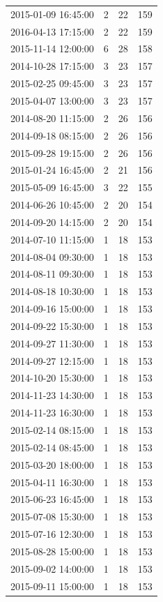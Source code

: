 \begin{tabular}{lrrr}
2015-01-09 16:45:00 & 2 & 22 & 159 \\
2016-04-13 17:15:00 & 2 & 22 & 159 \\
2015-11-14 12:00:00 & 6 & 28 & 158 \\
2014-10-28 17:15:00 & 3 & 23 & 157 \\
2015-02-25 09:45:00 & 3 & 23 & 157 \\
2015-04-07 13:00:00 & 3 & 23 & 157 \\
2014-08-20 11:15:00 & 2 & 26 & 156 \\
2014-09-18 08:15:00 & 2 & 26 & 156 \\
2015-09-28 19:15:00 & 2 & 26 & 156 \\
2015-01-24 16:45:00 & 2 & 21 & 156 \\
2015-05-09 16:45:00 & 3 & 22 & 155 \\
2014-06-26 10:45:00 & 2 & 20 & 154 \\
2014-09-20 14:15:00 & 2 & 20 & 154 \\
2014-07-10 11:15:00 & 1 & 18 & 153 \\
2014-08-04 09:30:00 & 1 & 18 & 153 \\
2014-08-11 09:30:00 & 1 & 18 & 153 \\
2014-08-18 10:30:00 & 1 & 18 & 153 \\
2014-09-16 15:00:00 & 1 & 18 & 153 \\
2014-09-22 15:30:00 & 1 & 18 & 153 \\
2014-09-27 11:30:00 & 1 & 18 & 153 \\
2014-09-27 12:15:00 & 1 & 18 & 153 \\
2014-10-20 15:30:00 & 1 & 18 & 153 \\
2014-11-23 14:30:00 & 1 & 18 & 153 \\
2014-11-23 16:30:00 & 1 & 18 & 153 \\
2015-02-14 08:15:00 & 1 & 18 & 153 \\
2015-02-14 08:45:00 & 1 & 18 & 153 \\
2015-03-20 18:00:00 & 1 & 18 & 153 \\
2015-04-11 16:30:00 & 1 & 18 & 153 \\
2015-06-23 16:45:00 & 1 & 18 & 153 \\
2015-07-08 15:30:00 & 1 & 18 & 153 \\
2015-07-16 12:30:00 & 1 & 18 & 153 \\
2015-08-28 15:00:00 & 1 & 18 & 153 \\
2015-09-02 14:00:00 & 1 & 18 & 153 \\
2015-09-11 15:00:00 & 1 & 18 & 153 \\

\end{tabular}
